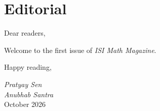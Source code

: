 \chapter*{Editorial}

Dear readers,

Welcome to the first issue of \textit{ISI Math Magazine}. 

Happy reading,

\bigskip
\noindent\textit{Pratyay Sen}\\
\textit{Anubhab Santra}\\
October 2026
